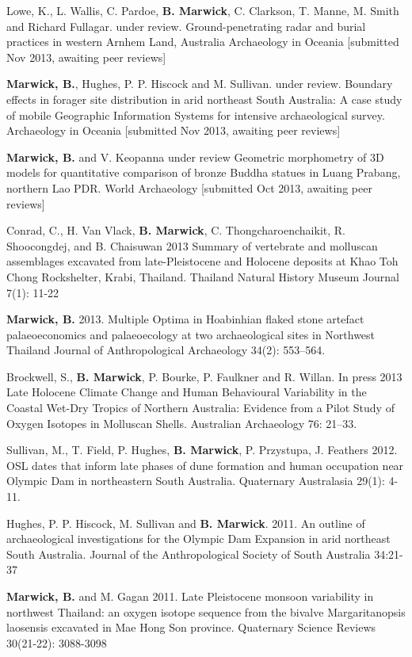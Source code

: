 \documentclass[11pt,article,oneside]{memoir}
\begin{document}
\ind Lowe, K., L. Wallis, C. Pardoe, \textbf{B. Marwick}, C. Clarkson, T. Manne, M. Smith and Richard Fullagar. under review. Ground-penetrating radar and burial practices in western Arnhem Land, Australia Archaeology in Oceania  [submitted Nov 2013, awaiting peer reviews] 

\ind \textbf{Marwick, B.}, Hughes, P. P. Hiscock and M. Sullivan. under review. Boundary effects in forager site distribution in arid northeast South Australia: A case study of mobile Geographic Information Systems for intensive archaeological survey. Archaeology in Oceania  [submitted Nov 2013, awaiting peer reviews]

\ind \textbf{Marwick, B.} and V. Keopanna under review Geometric morphometry of 3D models for quantitative comparison of bronze Buddha statues in Luang Prabang, northern Lao PDR. World Archaeology [submitted Oct 2013, awaiting peer reviews]

\ind Conrad, C., H. Van Vlack, \textbf{B. Marwick}, C. Thongcharoenchaikit, R. Shoocongdej, and B. Chaisuwan 2013 Summary of vertebrate and molluscan assemblages excavated from late-Pleistocene and Holocene deposits at Khao Toh Chong Rockshelter, Krabi, Thailand. Thailand Natural History Museum Journal 7(1): 11-22

\ind \textbf{Marwick, B.} 2013. Multiple Optima in Hoabinhian flaked stone artefact palaeoeconomics and palaeoecology at two archaeological sites in Northwest Thailand Journal of Anthropological Archaeology 34(2): 553–564.

\ind Brockwell, S., \textbf{B. Marwick}, P. Bourke, P. Faulkner and R. Willan. In press 2013 Late Holocene Climate Change and Human Behavioural Variability in the Coastal Wet-Dry Tropics of Northern Australia: Evidence from a Pilot Study of Oxygen Isotopes in Molluscan Shells. Australian Archaeology 76: 21–33.

\ind Sullivan, M., T. Field, P. Hughes, \textbf{B. Marwick}, P. Przystupa, J. Feathers 2012. OSL dates that inform late phases of dune formation and human occupation near Olympic Dam in northeastern South Australia. Quaternary Australasia 29(1): 4-11.

\ind Hughes, P. P. Hiscock, M. Sullivan and \textbf{B. Marwick}. 2011. An outline of archaeological investigations for the Olympic Dam Expansion in arid northeast South Australia. Journal of the Anthropological Society of South Australia 34:21-37

\ind \textbf{Marwick, B.} and M. Gagan 2011. Late Pleistocene monsoon variability in northwest Thailand: an oxygen isotope sequence from the bivalve Margaritanopsis laosensis excavated in Mae Hong Son province. Quaternary Science Reviews 30(21-22): 3088-3098
\end{document}
